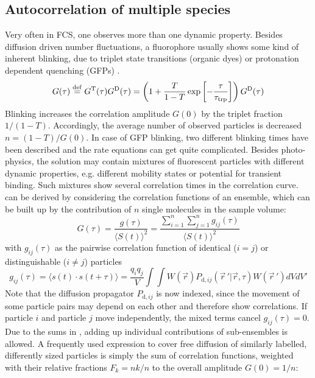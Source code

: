 \subsection{Autocorrelation of multiple species}
\label{sec:theor.autoc}
Very often in FCS, one observes more than one dynamic property. Besides diffusion driven number fluctuations, a fluorophore usually shows some kind of inherent blinking, due to triplet state transitions (organic dyes) or protonation dependent quenching (GFPs) \cite{Widengren1995}.
	\begin{equation}
	\label{eq11}
	G(\tau) \stackrel{\rm def}{=} G^{\rm T}(\tau) G^{\rm D}(\tau) = \left( 1+ \frac{T}{1-T} \exp\left[-\frac{\tau}{\tau_{\rm trp}} \right] \right)G^{\rm D}(\tau)
	\end{equation}
Blinking increases the correlation amplitude $G(0)$ by the triplet fraction $1/(1-T)$. Accordingly, the average number of observed particles is decreased $n = (1-T)/G(0)$. In case of GFP blinking, two different blinking times have been described and the rate equations can get quite complicated.
Besides photo-physics, the solution may contain mixtures of fluorescent particles with different dynamic properties, e.g. different mobility states or potential for transient binding. Such mixtures show several correlation times in the correlation curve.  can be derived by considering the correlation functions of an ensemble, which can be built up by the contribution of $n$ single molecules in the sample volume:
	\begin{equation}
	\label{eq12}
	G(\tau) = \frac{g(\tau)}{\langle S(t) \rangle^2} = \frac{\sum_{i=1}^n \sum_{j=1}^n g_{ij}(\tau)}{\langle S(t) \rangle^2}
	\end{equation}
with $g_{ij}(\tau)$ as the pairwise correlation function of identical ($i = j$) or distinguishable ($i \not= j$) particles 
	\begin{equation}
	\label{eq13}
	g_{ij}(\tau) = \langle s(t) \cdot s(t + \tau) \rangle = \frac{q_iq_j}{V} \int \int W(\vec{r}) P_{\mathrm{d},ij} \left( \vec{r} \,' | \vec{r},\tau \right) W(\vec{r}\,') dVdV'
	\end{equation}
Note that the diffusion propagator $P_{\mathrm{d},ij}$ is now indexed, since the movement of some particle pairs may depend on each other and therefore show correlations. If particle $i$ and particle $j$ move independently, the mixed terms cancel $g_{ij}(\tau) = 0$.
Due to the sums in , adding up individual contributions of sub-ensembles is allowed. A frequently used expression to cover free diffusion of similarly labelled, differently sized particles is simply the sum of correlation functions, weighted with their relative fractions $F_k = nk/n$ to the overall amplitude $G(0) = 1/n$:
